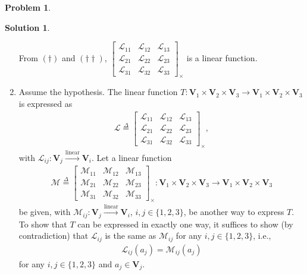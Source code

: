 \documentclass{article}
\theoremstyle{definition}
\newtheorem*{prob*}{Problem}
\newtheorem*{sln*}{Solution}
\newcommand{\V}{\mathbf{V}}
\newcommand{\lag}{\mathcal{L}}
\newcommand{\M}{\mathcal{M}}
\newcommand{\lin}{\overset{\text{linear}}{\longrightarrow}}
\begin{document}
\begin{prob*}
\begin{sln*}
\begin{enumerate}
			From $(\dagger)$ and $(\dagger\dagger)$, $
			\begin{bmatrix}
			\lag_{11} & \lag_{12} & \lag_{13}\\
			\lag_{21} & \lag_{22} & \lag_{23}\\
			\lag_{31} & \lag_{32} & \lag_{33}
			\end{bmatrix}_\times
			$
			is a linear function.\\
			
			\newpage
			
			\item Assume the hypothesis. The linear function $T : \V_1 \times \V_2 \times \V_3 \to \V_1\times\V_2\times \V_3$ is expressed as
			\begin{align*} 
			\lag  \stackrel{\Delta}{=}\begin{bmatrix}
			\lag_{11} & \lag_{12} & \lag_{13}\\
			\lag_{21} & \lag_{22} & \lag_{23}\\
			\lag_{31} & \lag_{32} & \lag_{33} 
			\end{bmatrix}_\times,
			\end{align*} 
			with $\lag_{ij} : \V_j \overset{\text{linear}}{\longrightarrow} \V_i$. Let a linear function
			\begin{align*}
			\M \stackrel{\Delta}{=}	\begin{bmatrix}
			\M_{11} & \M_{12} & \M_{13}\\
			\M_{21} & \M_{22} & \M_{23}\\
			\M_{31} & \M_{32} & \M_{33}
			\end{bmatrix}_\times : \V_1 \times \V_2 \times \V_3 \to \V_1\times\V_2\times \V_3
			\end{align*} 
			be given, with $\M_{ij} : \V_j \lin \V_i$, $i,j \in \{1,2,3 \}$, be another way to express $T$. To show that $T$ can be expressed in exactly one way, it suffices to show (by contradiction) that $\lag_{ij}$ is the same as $\M_{ij}$ for any $i,j \in \{1,2,3 \}$, i.e., 
			\begin{align*}
			\lag_{ij}(a_j) = \M_{ij}(a_j) 
			\end{align*}
			for any $i,j \in \{1,2,3 \}$ and $a_j \in \V_j$. \\
			

\end{enumerate}
\end{sln*}
\end{prob*}
\end{document}
